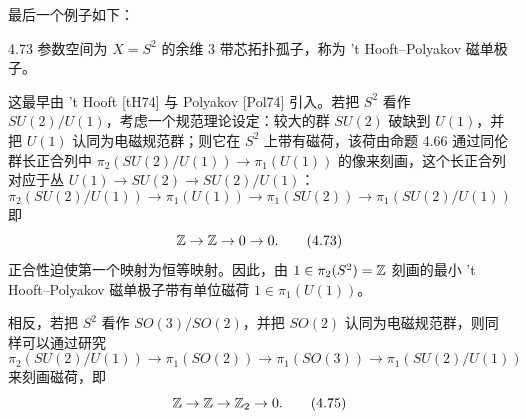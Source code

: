 最后一个例子如下：

\begin{example}{4.73}
参数空间为 $X=S^2$ 的余维 $3$ 带芯拓扑孤子，称为 't Hooft--Polyakov 磁单极子。
\end{example}

这最早由 't Hooft [tH74] 与 Polyakov [Pol74] 引入。若把 $S^2$ 看作 $SU(2)/U(1)$，考虑一个规范理论设定：较大的群 $SU(2)$ 破缺到 $U(1)$，并把 $U(1)$ 认同为电磁规范群；则它在 $S^2$ 上带有磁荷，该荷由命题 4.66 通过同伦群长正合列中 $\pi_2(SU(2)/U(1))\to\pi_1(U(1))$ 的像来刻画，这个长正合列对应于丛 $U(1)\to SU(2)\to SU(2)/U(1)$：
\begin{equation}
\pi_2(SU(2)/U(1))\to\pi_1(U(1))\to\pi_1(SU(2))\to\pi_1(SU(2)/U(1))
\tag{4.72}
\end{equation}
即
\begin{equation}
\mathbb{Z}\to\mathbb{Z}\to 0\to 0.
\tag{4.73}
\end{equation}
正合性迫使第一个映射为恒等映射。因此，由 $1\in\pi_2(S^2)=\mathbb{Z}$ 刻画的最小 't Hooft--Polyakov 磁单极子带有单位磁荷 $1\in\pi_1(U(1))$。

相反，若把 $S^2$ 看作 $SO(3)/SO(2)$，并把 $SO(2)$ 认同为电磁规范群，则同样可以通过研究
\begin{equation}
\pi_2(SU(2)/U(1))\to\pi_1(SO(2))\to\pi_1(SO(3))\to\pi_1(SU(2)/U(1))
\tag{4.74}
\end{equation}
来刻画磁荷，即
\begin{equation}
\mathbb{Z}\to\mathbb{Z}\to\mathbb{Z}_2\to 0.
\tag{4.75}
\end{equation}


